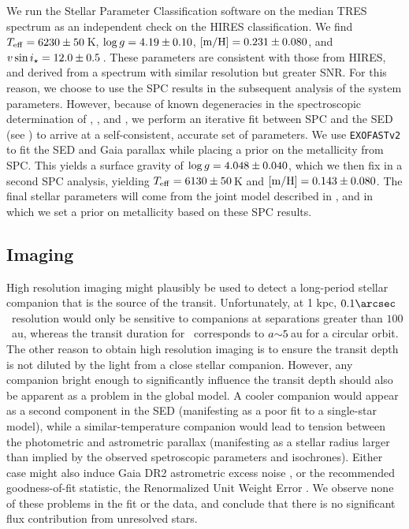 \documentclass[twocolumn]{aastex63}
\begin{document}


We run the Stellar Parameter Classification software \citep[SPC;][]{Buchhave:2012} on the median TRES spectrum as an independent check on the HIRES classification. We find $\teff = 6230 \pm 50$\,K, $\logg = 4.19 \pm 0.10$, $\mbox{$\rm{[m/H]}$} = 0.231 \pm 0.080$, and $\vsini = 12.0 \pm 0.5$\,\kms. These parameters are consistent with those from HIRES, and derived from a spectrum with similar resolution but greater SNR. For this reason, we choose to use the SPC results in the subsequent analysis of the system parameters. However, because of known degeneracies in the spectroscopic determination of \teff, \logg, and \mh, we perform an iterative fit between SPC and the SED (see ) to arrive at a self-consistent, accurate set of parameters. We use \texttt{EXOFASTv2} to fit the SED and Gaia parallax while placing a prior on the metallicity from SPC. This yields a surface gravity of $\logg=4.048 \pm 0.040$, which we then fix in a second SPC analysis, yielding $\teff = 6130 \pm 50$\,K and $\mbox{$\rm{[m/H]}$}=0.143 \pm 0.080$. The final stellar parameters will come from the joint model described in , and in which we set a prior on metallicity based on these SPC results.

\subsection{Imaging}
\label{sec:imaging}

High resolution imaging might plausibly be used to detect a long-period stellar companion that is the source of the transit. Unfortunately, at 1 kpc, $0.1\arcsec$\ resolution would only be sensitive to companions at separations greater than $100$\ au, whereas the transit duration for \thisstarb\ corresponds to $a \mathord{\sim} 5$\,au for a circular orbit. The other reason to obtain high resolution imaging is to ensure the transit depth is not diluted by the light from a close stellar companion. However, any companion bright enough to significantly influence the transit depth should also be apparent as a problem in the global model. A cooler companion would appear as a second component in the SED (manifesting as a poor fit to a single-star model), while a similar-temperature companion would lead to tension between the photometric and astrometric parallax (manifesting as a stellar radius larger than implied by the observed spetroscopic parameters and isochrones). Either case might also induce Gaia DR2 astrometric excess noise \citep{lindegren:2018a}, or the recommended goodness-of-fit statistic, the Renormalized Unit Weight Error \citep[RUWE;][]{lindegren:2018b}. We observe none of these problems in the fit or the data, and conclude that there is no significant flux contribution from unresolved stars.
\end{document}

